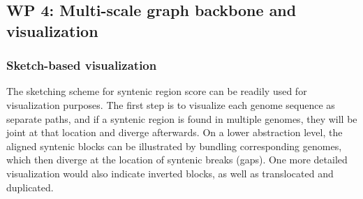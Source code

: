 \subsection{WP 4: Multi-scale graph backbone and visualization}



\subsubsection*{Sketch-based visualization}
The sketching scheme for syntenic region score can be readily used for visualization purposes. The first step is to visualize each genome sequence as separate paths, and if a syntenic region is found in multiple genomes, they will be joint at that location and diverge afterwards. On a lower abstraction level, the aligned syntenic blocks can be illustrated by bundling corresponding genomes, which then diverge at the location of syntenic breaks (gaps). One more detailed visualization would also indicate inverted blocks, as well as translocated and duplicated. 

